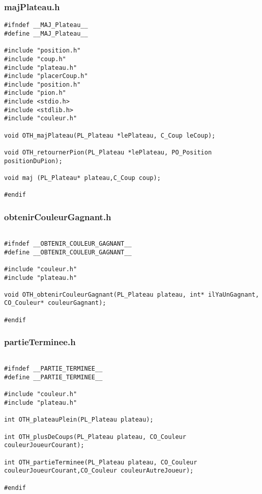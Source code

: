 \subsubsection{majPlateau.h}
\begin{lstlisting}
#ifndef __MAJ_Plateau__
#define __MAJ_Plateau__

#include "position.h"
#include "coup.h"
#include "plateau.h"
#include "placerCoup.h"
#include "position.h"
#include "pion.h"
#include <stdio.h>
#include <stdlib.h>
#include "couleur.h"

void OTH_majPlateau(PL_Plateau *lePlateau, C_Coup leCoup);

void OTH_retournerPion(PL_Plateau *lePlateau, PO_Position positionDuPion);

void maj (PL_Plateau* plateau,C_Coup coup);

#endif

\end{lstlisting}

\subsubsection{obtenirCouleurGagnant.h}
\begin{lstlisting}

#ifndef __OBTENIR_COULEUR_GAGNANT__
#define __OBTENIR_COULEUR_GAGNANT__

#include "couleur.h" 
#include "plateau.h"

void OTH_obtenirCouleurGagnant(PL_Plateau plateau, int* ilYaUnGagnant, CO_Couleur* couleurGagnant);

#endif
\end{lstlisting}
\subsubsection{partieTerminee.h}
\begin{lstlisting}

#ifndef __PARTIE_TERMINEE__
#define __PARTIE_TERMINEE__

#include "couleur.h"
#include "plateau.h"

int OTH_plateauPlein(PL_Plateau plateau);

int OTH_plusDeCoups(PL_Plateau plateau, CO_Couleur couleurJoueurCourant);

int OTH_partieTerminee(PL_Plateau plateau, CO_Couleur couleurJoueurCourant,CO_Couleur couleurAutreJoueur);

#endif
\end{lstlisting}
